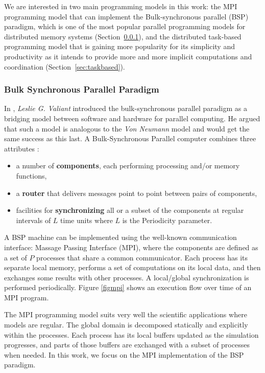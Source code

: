 We are interested in two main programming models in this work: the MPI programming model that can implement the Bulk-synchronous parallel (BSP) paradigm, which is one of the most popular parallel programming models for distributed memory systems \cite{BRINSKIY2015305_MPI_3} (Section~\ref{BSP}), and the distributed task-based programming model that is gaining more popularity for its simplicity and productivity as it intends to provide more and more implicit computations and coordination (Section~\ref{sec:taskbased}).


\subsubsection{Bulk Synchronous Parallel Paradigm}\label{BSP}
In \cite{valiant1990bsp}, \textit{Leslie G. Valiant} introduced the bulk-synchronous parallel paradigm as a bridging model between software and hardware for parallel computing. He argued that such a model is analogous to the \textit{Von Neumann} model and would get the same success as this last.
A Bulk-Synchronous Parallel computer combines three attributes : 
\begin{itemize}
    \item a number of \textbf{components}, each performing processing and/or memory functions,
    \item a \textbf{router} that delivers messages point to point between pairs of components,
    \item facilities for \textbf{synchronizing} all or a subset of the components at regular intervals of $L$ time units where $L$ is the Periodicity parameter.
\end{itemize}

A BSP machine can be implemented using the well-known communication interface: Massage Passing Interface (MPI), where the components are defined as a set of $P$ processes that share a common communicator. Each process has its separate local memory, performs a set of computations on its local data, and then exchanges some results with other processes. A local/global synchronization is performed periodically. Figure \ref{figmpi} shows an execution flow over time of an MPI program. 

The MPI programming model suits very well the scientific applications where models are regular. The global domain is decomposed statically and explicitly within the processes. Each process has its local buffers updated as the simulation progresses, and parts of those buffers are exchanged with a subset of processes when needed. In this work, we focus on the MPI implementation of the BSP paradigm.

